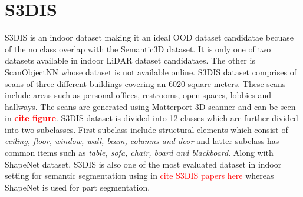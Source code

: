 \section{S3DIS}
S3DIS is an indoor dataset making it an ideal OOD dataset candidatae becuase of the no class overlap with the Semantic3D dataset.
It is only one of two datasets available in indoor LiDAR dataset candidataes. 
The other is ScanObjectNN whose dataset is not available online.
S3DIS dataset comprises of scans of three different buildings covering an 6020 square meters.
These scans include areas such as personal offices, restrooms, open spaces, lobbies and hallways.
The scans are generated using Matterport 3D scanner and can be seen in \textcolor{red}{\textbf{cite figure}}.
S3DIS dataset is divided into 12 classes which are further divided into two subclasses.
First subclass include structural elements which consist of \textit{ceiling, floor, window, wall, beam, columns and door}
and latter subclass has common items such as \textit{table, sofa, chair, board and blackboard}.
Along with ShapeNet dataset, S3DIS is also one of the most evaluated dataset in indoor setting for semantic segmentation  using in \textcolor{red}{cite S3DIS papers here} whereas ShapeNet is used for part segmentation.

